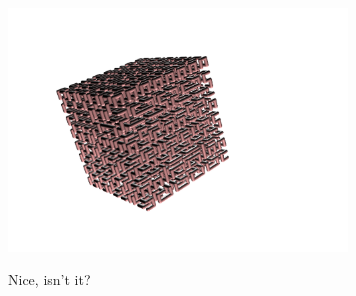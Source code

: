 \begin{center}
\begin{minipage}{7cm}
 \includegraphics[width=9cm]{pics/linden-hilbert4.png}
\end{minipage}
\end{center}
Nice, isn't it?